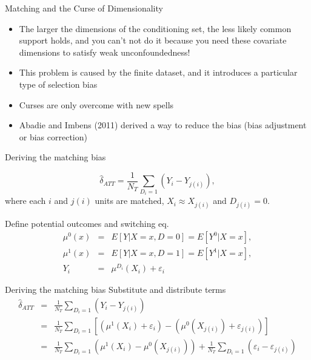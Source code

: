 \documentclass{beamer}
\begin{document}
\begin{frame}{Matching and the Curse of Dimensionality}
	
\begin{itemize}
\item The larger the dimensions of the conditioning set, the less likely common support holds, and you can't not do it because you need these covariate dimensions to satisfy weak unconfoundedness!
\item This problem is caused by the finite dataset, and it introduces a particular type of selection bias
\item Curses are only overcome with new spells  
\item Abadie and Imbens (2011) derived a way to reduce the bias (bias adjustment or bias correction)
\end{itemize}

\end{frame}


\begin{frame}{Deriving the matching bias}
	
  \vspace{-5mm}
  $$
		\widehat{\delta}_{ATT} = \frac{1}{N_T} \sum_{D_i=1} (Y_i - Y_{j(i)}),
  $$
  where each $i$ and $j(i)$ units are matched, $X_i \approx X_{j(i)}$ and $D_{j(i)}=0$. 
	 
  \bigskip
  Define potential outcomes and switching eq.
		\begin{eqnarray*}
      \mu^0(x) &=& E[Y | X=x,D=0] = E[Y^0 | X=x],\\
      \mu^1(x) &=& E[Y | X=x,D=1] = E[Y^1 | X=x],\\
      Y_i &=& \mu^{D_i}(X_i) + \varepsilon_i
		\end{eqnarray*}
\end{frame}

\begin{frame}{Deriving the matching bias}
  Substitute and distribute terms
  \begin{eqnarray*}
    \widehat{\delta}_{ATT} &=& \frac{1}{N_T} \sum_{D_i=1} (Y_i - Y_{j(i)}) \\
    &=& \frac{1}{N_T} \sum_{D_i=1} \left[ (\mu^1(X_i) + \varepsilon_i) - (\mu^0(X_{j(i)}) + \varepsilon_{j(i)}) \right] \\
    &=&  \frac{1}{N_T} \sum_{D_i=1} (\mu^1(X_i) - \mu^0(X_{j(i)})) + \frac{1}{N_T} \sum_{D_i=1}(\varepsilon_i - \varepsilon_{j(i)})
  \end{eqnarray*}
\end{frame}
		
\end{document}
